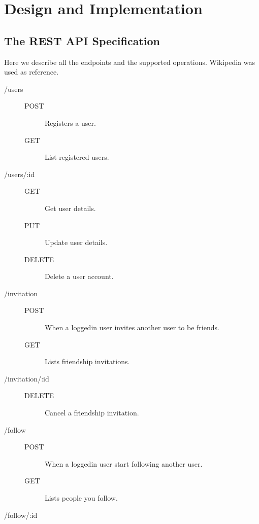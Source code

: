 \section{Design and Implementation}

\subsection{The REST API Specification}

Here we describe all the endpoints and the supported operations.
Wikipedia\cite{wikipediarest} was used as reference.

\begin{description}
  \item [/users] \hfill
    \begin{description}
      \item [POST] Registers a user.
      \item [GET] List registered users.
    \end{description}
  \item [/users/:id] \hfill
    \begin{description}
      \item [GET] Get user details.
      \item [PUT] Update user details.
      \item [DELETE] Delete a user account.
    \end{description}
  \item [/invitation] \hfill
    \begin{description}
      \item [POST] When a loggedin user invites another user to be friends.
      \item [GET] Lists friendship invitations.
    \end{description}
  \item [/invitation/:id] \hfill
    \begin{description}
      \item [DELETE] Cancel a friendship invitation.
    \end{description}
  \item [/follow] \hfill
    \begin{description}
      \item [POST] When a loggedin user start following another user.
      \item [GET] Lists people you follow.
    \end{description}
  \item [/follow/:id] \hfill

\end{description}
